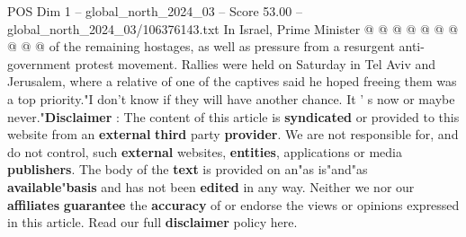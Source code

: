 \begin{textsample}{POS Dim 1 – global\_north\_2024\_03 – Score 53.00 – global\_north\_2024\_03/106376143.txt}
In Israel, Prime Minister @ @ @ @ @ @ @ @ @ @ of the remaining hostages, as well as pressure from a resurgent anti-government protest movement.
Rallies were held on Saturday in Tel Aviv and Jerusalem, where a relative of one of the captives said he hoped freeing them was a top priority."I don't know if they will have another chance.
It ' s now or maybe never."\textbf{Disclaimer} : The content of this article is \textbf{syndicated} or provided to this website from an \textbf{external} \textbf{third} party \textbf{provider}.
We are not responsible for, and do not control, such \textbf{external} websites, \textbf{entities}, applications or media \textbf{publishers}.
The body of the \textbf{text} is provided on an"as is"and"as \textbf{available}"\textbf{basis} and has not been \textbf{edited} in any way.
Neither we nor our \textbf{affiliates} \textbf{guarantee} the \textbf{accuracy} of or endorse the views or opinions expressed in this article.
Read our full \textbf{disclaimer} policy here.

\end{textsample}
